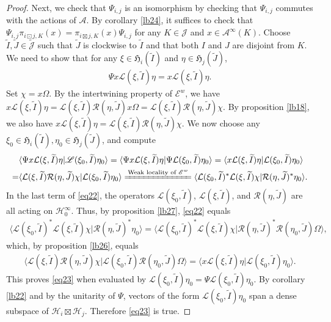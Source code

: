 \documentclass[12pt,a4paper]{article}
\theoremstyle{definition}
\theoremstyle{plain}
\newcommand{\fk}{\mathfrak}
\newcommand{\mc}{\mathcal}
\newcommand{\wtd}{\widetilde}
\newcommand{\bk}[1]{\langle {#1}\rangle}
\newcommand{\scr}{\mathscr}
\newcommand{\Jtd}{\widetilde{\mathcal J}}
\numberwithin{equation}{subsection}
\begin{document}
\begin{proof}
Next, we check that $\Psi_{i,j}$ is an isomorphism by checking that $\Psi_{i,j}$ commutes with the actions of $\mc A$. By corollary \ref{lb24}, it suffices to check that $\Psi_{i,j}\pi_{i\boxdot j,K}(x)=\pi_{i\boxtimes j,K}(x)\Psi_{i,j}$ for any $K\in\mc J$ and $x\in\mc A^\infty(K)$.  Choose $\wtd I,\wtd J\in\Jtd$ such that $\wtd J$ is clockwise to $\wtd I$ and that both $I$ and $J$ are disjoint from $K$. We need to show that for any $\xi\in\fk H_i(\wtd I)$ and $\eta\in\fk H_j(\wtd J)$,
\begin{align}
\Psi x\mc L(\xi,\wtd I)\eta=x\scr L(\xi,\wtd I)\eta.\label{eq23}
\end{align}
Set $\chi=x\Omega$. By the  intertwining property of $\scr E^w$, we have $x\mc L(\xi,\wtd I)\eta=\mc L(\xi,\wtd I)\mc R(\eta,\wtd J)x\Omega=\mc L(\xi,\wtd I)\mc R(\eta,\wtd J)\chi$. By proposition \ref{lb18}, we also have $x\scr L(\xi,\wtd I)\eta=\scr L(\xi,\wtd I)\scr R(\eta,\wtd J)\chi$. We now choose any $\xi_0\in\fk H_i(\wtd I),\eta_0\in\fk H_j(\wtd J)$, and compute
\begin{align}
&\bk{\Psi x\mc L(\xi,\wtd I)\eta|\scr L(\xi_0,\wtd I)\eta_0}=\bk{\Psi x\mc L(\xi,\wtd I)\eta|\Psi\mc L(\xi_0,\wtd I)\eta_0}=\bk{x\mc L(\xi,\wtd I)\eta|\mc L(\xi_0,\wtd I)\eta_0}\nonumber\\
=&\bk{\mc L(\xi,\wtd I)\mc R(\eta,\wtd J)\chi|\mc L(\xi_0,\wtd I)\eta_0}\xlongequal{\text{Weak locality of $\scr E^w$}}\bk{\mc L(\xi_0,\wtd I)^*\mc L(\xi,\wtd I)\chi|\mc R(\eta,\wtd J)^*\eta_0}.\label{eq22}
\end{align}
In the last term of \eqref{eq22}, the operators $\mc L(\xi_0,\wtd I)$, $\mc L(\xi,\wtd I)$, and $\mc R(\eta,\wtd J)$ are all acting on $\mc H_0^\infty$. Thus, by proposition \ref{lb27}, \eqref{eq22} equals
\begin{align*}
\bk{\scr L(\xi_0,\wtd I)^*\scr L(\xi,\wtd I)\chi|\scr R(\eta,\wtd J)^*\eta_0}=\bk{\scr L(\xi_0,\wtd I)^*\scr L(\xi,\wtd I)\chi|\scr R(\eta,\wtd J)^*\scr R(\eta_0,\wtd J)\Omega},
\end{align*}
which, by proposition \ref{lb26}, equals
\begin{align*}
\bk{\scr L(\xi,\wtd I)\scr R(\eta,\wtd J)\chi|\scr L(\xi_0,\wtd I)\scr R(\eta_0,\wtd J)\Omega}=\bk{x\scr L(\xi,\wtd I)\eta|\scr L(\xi_0,\wtd I)\eta_0}.
\end{align*}
This proves \eqref{eq23} when evaluated by $\scr L(\xi_0,\wtd I)\eta_0=\Psi\mc L(\xi_0,\wtd I)\eta_0$. By corollary \ref{lb22} and by the unitarity of $\Psi$, vectors of the form $\scr L(\xi_0,\wtd I)\eta_0$ span a dense subspace of $\mc H_i\boxtimes\mc H_j$. Therefore \eqref{eq23} is true.



\end{proof}
\end{document}
